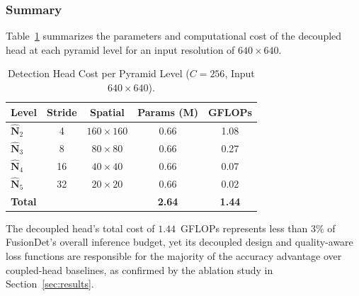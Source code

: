 \subsubsection{Summary}

Table~\ref{tab:head_summary} summarizes the parameters and
computational cost of the decoupled head at each pyramid level
for an input resolution of $640\times640$.

\begin{table}[h]
\centering
\caption{Detection Head Cost per Pyramid Level ($C=256$,
         Input $640{\times}640$).}
\label{tab:head_summary}
\renewcommand{\arraystretch}{1.1}
\begin{tabular}{@{}lcccc@{}}
\toprule
Level & Stride & Spatial & Params (M) & GFLOPs \\
\midrule
$\hat{\mathbf{N}}_2$ & 4  & $160{\times}160$ & 0.66 & 1.08 \\
$\hat{\mathbf{N}}_3$ & 8  & $80{\times}80$   & 0.66 & 0.27 \\
$\hat{\mathbf{N}}_4$ & 16 & $40{\times}40$   & 0.66 & 0.07 \\
$\hat{\mathbf{N}}_5$ & 32 & $20{\times}20$   & 0.66 & 0.02 \\
\midrule
\textbf{Total}       &    &                  & \textbf{2.64} & \textbf{1.44} \\
\bottomrule
\end{tabular}
\end{table}

The decoupled head's total cost of $1.44$~GFLOPs represents
less than $3\%$ of FusionDet's overall inference budget, yet
its decoupled design and quality-aware loss functions are
responsible for the majority of the accuracy advantage over
coupled-head baselines, as confirmed by the ablation study
in Section~\ref{sec:results}.
